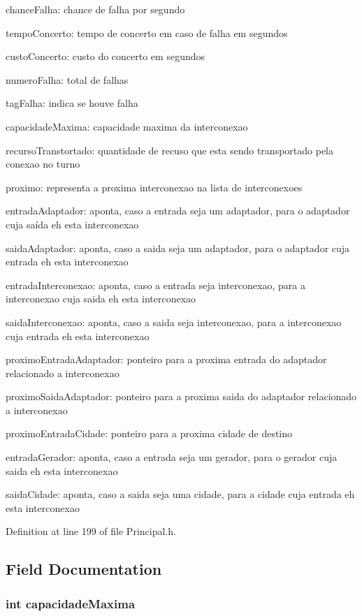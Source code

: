 chance\-Falha\-: chance de falha por segundo

tempo\-Concerto\-: tempo de concerto em caso de falha em segundos

custo\-Concerto\-: custo do concerto em segundos

numero\-Falha\-: total de falhas

tag\-Falha\-: indica se houve falha

capacidade\-Maxima\-: capacidade maxima da interconexao

recurso\-Transtortado\-: quantidade de recuso que esta sendo transportado pela conexao no turno

proximo\-: representa a proxima interconexao na lista de interconexoes

entrada\-Adaptador\-: aponta, caso a entrada seja um adaptador, para o adaptador cuja saída eh esta interconexao

saida\-Adaptador\-: aponta, caso a saida seja um adaptador, para o adaptador cuja entrada eh esta interconexao

entrada\-Interconexao\-: aponta, caso a entrada seja interconexao, para a interconexao cuja saida eh esta interconexao

saida\-Interconexao\-: aponta, caso a saida seja interconexao, para a interconexao cuja entrada eh esta interconexao

proximo\-Entrada\-Adaptador\-: ponteiro para a proxima entrada do adaptador relacionado a interconexao

proximo\-Saida\-Adaptador\-: ponteiro para a proxima saida do adaptador relacionado a interconexao

proximo\-Entrada\-Cidade\-: ponteiro para a proxima cidade de destino

entrada\-Gerador\-: aponta, caso a entrada seja um gerador, para o gerador cuja saida eh esta interconexao

saida\-Cidade\-: aponta, caso a saida seja uma cidade, para a cidade cuja entrada eh esta interconexao 

Definition at line 199 of file Principal.\-h.



\subsection{Field Documentation}
\hypertarget{structinterconexao_abe24567e8cdbfefa8ffa9d6911078a7a}{
\subsubsection[{capacidade\-Maxima}]{\setlength{\rightskip}{0pt plus 5cm}int capacidade\-Maxima}}\label{structinterconexao_abe24567e8cdbfefa8ffa9d6911078a7a}


